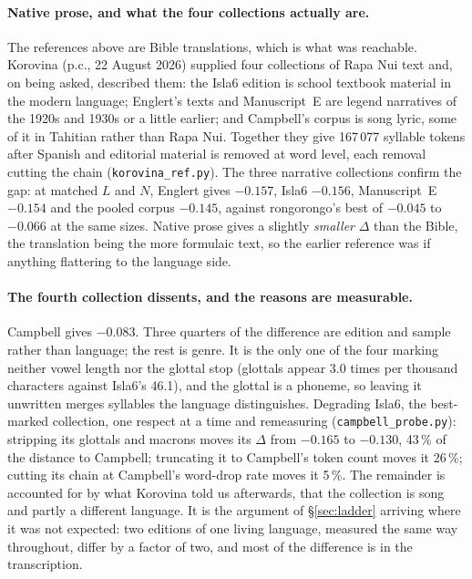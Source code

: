 \documentclass[11pt,a4paper]{article}
\begin{document}
\paragraph{Native prose, and what the four collections actually are.} The references above are Bible translations, which is what was reachable. Korovina (p.c., 22 August 2026) supplied four collections of Rapa Nui text and, on being asked, described them: the Isla6 edition is school textbook material in the modern language; Englert's texts and Manuscript~E are legend narratives of the 1920s and 1930s or a little earlier; and Campbell's corpus is song lyric, some of it in Tahitian rather than Rapa Nui. Together they give 167\,077 syllable tokens after Spanish and editorial material is removed at word level, each removal cutting the chain (\texttt{korovina\_ref.py}). The three narrative collections confirm the gap: at matched $L$ and $N$, Englert gives $-0.157$, Isla6 $-0.156$, Manuscript~E $-0.154$ and the pooled corpus $-0.145$, against rongorongo's best of $-0.045$ to $-0.066$ at the same sizes. Native prose gives a slightly \emph{smaller} $\Delta$ than the Bible, the translation being the more formulaic text, so the earlier reference was if anything flattering to the language side.

\paragraph{The fourth collection dissents, and the reasons are measurable.} Campbell gives $-0.083$. Three quarters of the difference are edition and sample rather than language; the rest is genre. It is the only one of the four marking neither vowel length nor the glottal stop (glottals appear 3.0 times per thousand characters against Isla6's 46.1), and the glottal is a phoneme, so leaving it unwritten merges syllables the language distinguishes. Degrading Isla6, the best-marked collection, one respect at a time and remeasuring (\texttt{campbell\_probe.py}): stripping its glottals and macrons moves its $\Delta$ from $-0.165$ to $-0.130$, 43\,\% of the distance to Campbell; truncating it to Campbell's token count moves it 26\,\%; cutting its chain at Campbell's word-drop rate moves it 5\,\%. The remainder is accounted for by what Korovina told us afterwards, that the collection is song and partly a different language. It is the argument of \S\ref{sec:ladder} arriving where it was not expected: two editions of one living language, measured the same way throughout, differ by a factor of two, and most of the difference is in the transcription.
\end{document}
